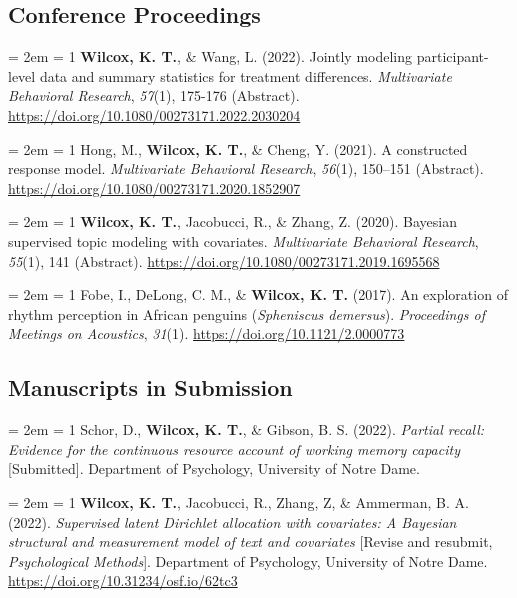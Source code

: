 \documentclass[
  12 pt,
]{article}
\begin{document}
\hypertarget{conference-proceedings}{%
\subsection{Conference Proceedings}\label{conference-proceedings}}

\hangindent = 2em \hangafter = 1 \textbf{Wilcox, K. T.}, \& Wang, L.
(2022). Jointly modeling participant-level data and summary statistics
for treatment differences. \emph{Multivariate Behavioral Research},
\emph{57}(1), 175-176 (Abstract).
\url{https://doi.org/10.1080/00273171.2022.2030204}

\hangindent = 2em \hangafter = 1 Hong, M., \textbf{Wilcox, K. T.}, \&
Cheng, Y. (2021). A constructed response model. \emph{Multivariate
Behavioral Research}, \emph{56}(1), 150--151 (Abstract).
\url{https://doi.org/10.1080/00273171.2020.1852907}

\hangindent = 2em \hangafter = 1 \textbf{Wilcox, K. T.}, Jacobucci, R.,
\& Zhang, Z. (2020). Bayesian supervised topic modeling with covariates.
\emph{Multivariate Behavioral Research}, \emph{55}(1), 141 (Abstract).
\url{https://doi.org/10.1080/00273171.2019.1695568}

\hangindent = 2em \hangafter = 1 Fobe, I., DeLong, C. M., \&
\textbf{Wilcox, K. T.} (2017). An exploration of rhythm perception in
African penguins (\emph{Spheniscus demersus}). \emph{Proceedings of
Meetings on Acoustics}, \emph{31}(1).
\url{https://doi.org/10.1121/2.0000773}

\hypertarget{manuscripts-in-submission}{%
\subsection{Manuscripts in Submission}\label{manuscripts-in-submission}}

\hangindent = 2em \hangafter = 1 Schor, D., \textbf{Wilcox, K. T.}, \&
Gibson, B. S. (2022). \emph{Partial recall: Evidence for the continuous
resource account of working memory capacity} {[}Submitted{]}. Department
of Psychology, University of Notre Dame.

\hangindent = 2em \hangafter = 1 \textbf{Wilcox, K. T.}, Jacobucci, R.,
Zhang, Z, \& Ammerman, B. A. (2022). \emph{Supervised latent Dirichlet
allocation with covariates: A Bayesian structural and measurement model
of text and covariates} {[}Revise and resubmit, \emph{Psychological
Methods}{]}. Department of Psychology, University of Notre Dame.
\url{https://doi.org/10.31234/osf.io/62tc3}
\end{document}
